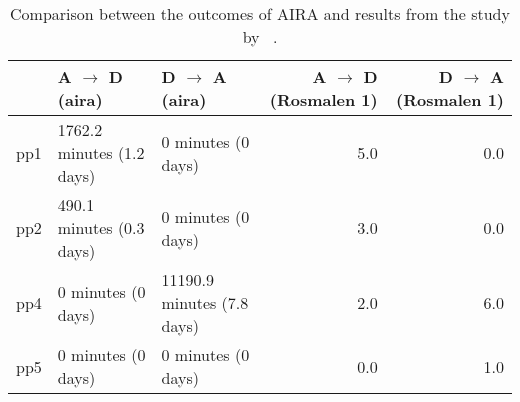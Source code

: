 \begin{table*}[ht]
\centering
\begin{tabular}{rllrr}
  \toprule
 & A $\rightarrow$ D (aira) & D $\rightarrow$ A (aira) & A $\rightarrow$ D (Rosmalen 1) & D $\rightarrow$ A (Rosmalen 1) \\ 
  \midrule
pp1 & 1762.2 minutes (1.2 days) & 0 minutes (0 days) & 5.0 & 0.0 \\ 
  pp2 & 490.1 minutes (0.3 days) & 0 minutes (0 days) & 3.0 & 0.0 \\ 
  pp4 & 0 minutes (0 days) & 11190.9 minutes (7.8 days) & 2.0 & 6.0 \\ 
  pp5 & 0 minutes (0 days) & 0 minutes (0 days) & 0.0 & 1.0 \\ 
   \bottomrule
\end{tabular}
\caption{Comparison between the outcomes of AIRA and results from the study by \citeauthor{RefWorks:4}~\cite{RefWorks:4}.} 
\label{tab:comparison}
\end{table*}
